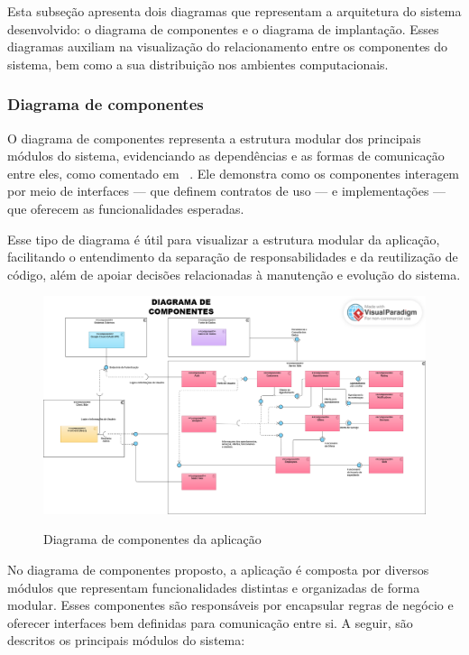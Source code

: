 Esta subseção apresenta dois diagramas que representam a arquitetura do sistema desenvolvido: o diagrama de componentes e o diagrama de implantação. Esses diagramas auxiliam na visualização do relacionamento entre os componentes do sistema, bem como a sua distribuição nos ambientes computacionais.

\subsubsection{Diagrama de componentes}

O diagrama de componentes representa a estrutura modular dos principais módulos do sistema, evidenciando as dependências e as formas de comunicação entre eles, como comentado em ~\cite{Booch2005}. Ele demonstra como os componentes interagem por meio de interfaces — que definem contratos de uso — e implementações — que oferecem as funcionalidades esperadas.

Esse tipo de diagrama é útil para visualizar a estrutura modular da aplicação, facilitando o entendimento da separação de responsabilidades e da reutilização de código, além de apoiar decisões relacionadas à manutenção e evolução do sistema.

\begin{figure}[htb]
  \centering
  \caption{Diagrama de componentes da aplicação}
  \includegraphics[width=1.1\textwidth]{cap04-desenvolvimento/images/4-3-2-1-diagrama-componentes}
  \label{fig:diagrama-componente}
\end{figure}
\FloatBarrier


No diagrama de componentes proposto, a aplicação é composta por diversos módulos que representam funcionalidades distintas e organizadas de forma modular. Esses componentes são responsáveis por encapsular regras de negócio e oferecer interfaces bem definidas para comunicação entre si. A seguir, são descritos os principais módulos do sistema:

